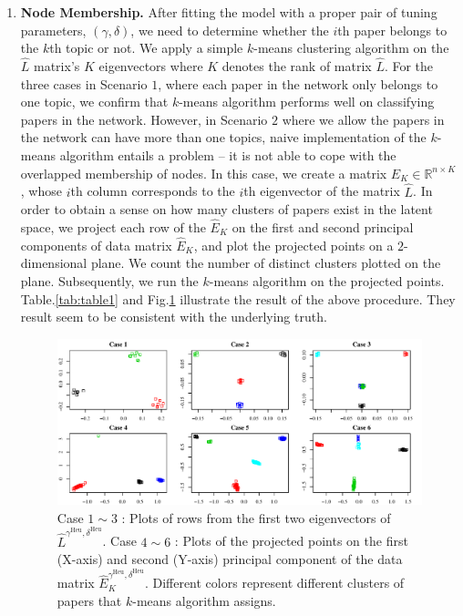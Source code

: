\documentclass[AMS,STIX1COL]{WileyNJD-v2}
\begin{document}
{\begin{enumerate}
    \item \textbf{Node Membership.}
    After fitting the model with a proper pair of tuning parameters, $(\gamma,\delta)$, we need to determine whether the $i$th paper belongs to the $k$th topic or not.
    We apply a simple $k$-means clustering algorithm on the $\widehat{L}$ matrix's  $K$ eigenvectors where $K$ denotes the rank of matrix $\widehat{L}$.
    For the three cases in Scenario $1$, where each paper in the network only belongs to one topic, we confirm that $k$-means algorithm performs well on classifying papers in the network.
    However, in Scenario $2$ where we allow the papers in the network can have more than one topics, naive implementation of the $k$-means algorithm entails a problem -- it is not able to cope with the overlapped membership of nodes.
    In this case, we create a matrix $\widehat{E}_{K}\in \mathbb{R}^{n \times K}$, whose $i$th column corresponds to the $i$th eigenvector of the matrix $\widehat{L}$.
    In order to obtain a sense on how many clusters of papers exist in the latent space, we project each row of the $\widehat{E}_{K}$ on the first and second principal components of data matrix $\widehat{E}_{K}$, and plot the projected points on a $2$-dimensional plane.
    We count the number of distinct clusters plotted on the plane.
    Subsequently, we run the $k$-means algorithm on the projected points.
    Table.\ref{tab:table1} and Fig.\ref{fig:figure3} illustrate the result of the above procedure.
    They result seem to be consistent with the underlying truth.

    \begin{figure}[htbp]
    \centering
    \includegraphics[width=1\textwidth]{Fig3.pdf}
    \caption{ Case $1\sim3$ : Plots of rows from the first two eigenvectors of $\widehat{L}^{\gamma^{\text{Heu}},\delta^{\text{Heu}}}$.
    Case $4 \sim 6$ : Plots of the projected points on the first (X-axis) and second (Y-axis) principal component of the data matrix $\widehat{E}_{K}^{\gamma^{\text{Heu}},\delta^{\text{Heu}}}$. Different colors represent different clusters of papers that $k$-means algorithm assigns.}
    \label{fig:figure3}
    \end{figure}


\end{enumerate}}
\end{document}
